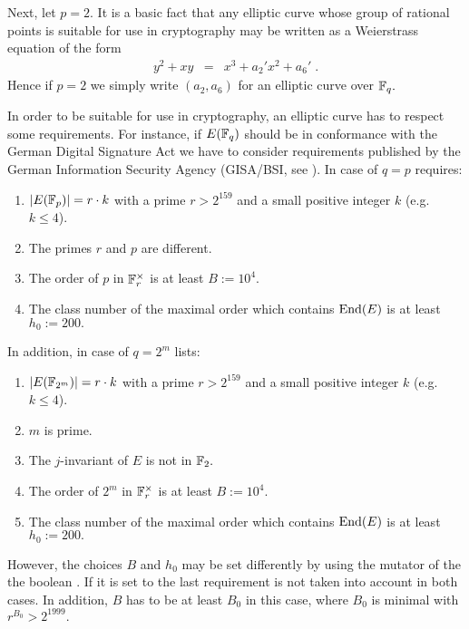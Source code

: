 Next, let $p = 2.$ It is a basic fact that any elliptic
curve whose group of rational points is suitable for use
in cryptography may be written as a Weierstrass
equation of the form
\begin{eqnarray}\label{eq_short_weierstrass_2}
y^2 +xy& = & x^3 + a_2'x^2+a_6'\; .
\end{eqnarray}
Hence if $p = 2$ we simply write $(a_2,a_6)$ for an
elliptic curve over $\mathbb{F}_q.$

In order to be suitable for use in cryptography,
an elliptic curve has to respect some requirements. For instance,
if $E(\mathbb{F}_q)$ should be in conformance with
the German Digital Signature Act we have to consider
requirements published by the German Information
Security Agency (GISA/BSI, see \cite{BSI01}). In case of $q=p$
\cite{BSI01} requires:
\begin{enumerate} 
\item\label{cond_sq_gec_p} $|E(\mathbb{F}_p)| =r\cdot k$ with a prime 
$r> 2^{159}$ and a small positive integer $k$ (e.g.~$k\leq 4$).
\item\label{cond_smart_gec_p} The primes $r$ and $p$ are different.
\item\label{cond_mov_gec_p} The order of $p$ in $\mathbb{F}_r^\times$
is at least $B:=10^4.$
\item\label{cond_bsi_gec_p} The class number of the maximal order which
contains $\operatorname{End}(E)$ is at least $h_0:=200.$
\end{enumerate}

In addition, in case of $q=2^m$ \cite{BSI01} lists:
\begin{enumerate} 
\item\label{cond_sq_gec_2} $|E(\mathbb{F}_{2^m})| =r\cdot k$ with a prime 
$r> 2^{159}$ and a small positive integer $k$ (e.g.~$k\leq 4$).
\item\label{cond_m_gec_2} $m$ is prime.
\item\label{cond_def_gec_2} The $j$-invariant of $E$ is not in $\mathbb{F}_2.$
\item\label{cond_mov_gec_2} The order of $2^m$ in $\mathbb{F}_r^\times$
is at least $B:=10^4.$
\item\label{cond_bsi_gec_2} The class number of the maximal order which
contains $\operatorname{End}(E)$ is at least $h_0:=200.$
\end{enumerate}

However, the choices $B$ and $h_0$ may be set
differently by using the mutator of the
the boolean . If it is set to 
the last requirement is not taken into account in both cases. In addition,
$B$ has to be at least $B_0$ in this case, where $B_0$ is minimal with
$r^{B_0}>2^{1999}.$

